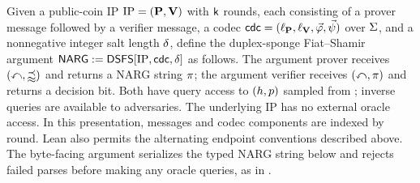 \begin{construction}
\label{constr:dsfs_transformation}
\leanok
{}
Given a public-coin IP \(\mathrm{IP}=(\mathbf{P},\mathbf{V})\) with \(\mathsf{k}\) rounds, each consisting of a prover message followed by a verifier message, a codec \(\mathsf{cdc}=(\ell_{\mathbf{P}},\ell_{\mathbf{V}},\vec{\varphi},\vec{\psi})\) over \(\Sigma\), and a nonnegative integer salt length \(\delta\), define the duplex-sponge Fiat--Shamir argument \(\mathsf{NARG}:=\mathsf{DSFS}[\mathrm{IP},\mathsf{cdc},\delta]\) as follows. The argument prover receives \((\mathbb{x},\mathbb{w})\) and returns a NARG string \(\pi\); the argument verifier receives \((\mathbb{x},\pi)\) and returns a decision bit. Both have query access to \((h,p)\) sampled from ; inverse queries are available to adversaries. The underlying IP has no external oracle access. In this presentation, messages and codec components are indexed by round. Lean also permits the alternating endpoint conventions described above. The byte-facing argument serializes the typed NARG string below and rejects failed parses before making any oracle queries, as in .


\end{construction}
